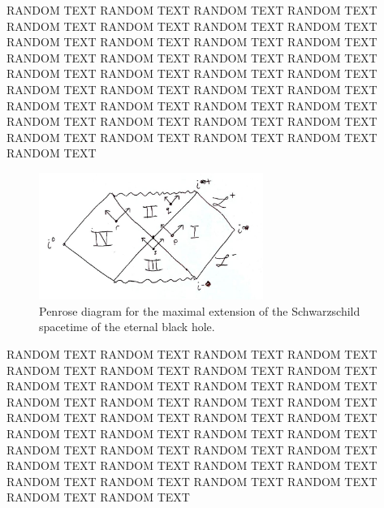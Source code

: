 RANDOM TEXT RANDOM TEXT RANDOM TEXT RANDOM TEXT RANDOM TEXT RANDOM TEXT RANDOM TEXT RANDOM TEXT RANDOM TEXT RANDOM TEXT RANDOM TEXT RANDOM TEXT RANDOM TEXT RANDOM TEXT RANDOM TEXT RANDOM TEXT RANDOM TEXT RANDOM TEXT RANDOM TEXT RANDOM TEXT RANDOM TEXT RANDOM TEXT RANDOM TEXT RANDOM TEXT RANDOM TEXT RANDOM TEXT RANDOM TEXT RANDOM TEXT RANDOM TEXT RANDOM TEXT RANDOM TEXT RANDOM TEXT RANDOM TEXT RANDOM TEXT RANDOM TEXT RANDOM TEXT RANDOM TEXT 

\begin{figure}[H]
\centering
    \includegraphics[width=0.65\textwidth]{png/scbh_penrose.png}
    \caption{Penrose diagram for the maximal extension of the Schwarzschild spacetime of the eternal black hole.}
    \label{intro:fig:scbh_penrose}
\end{figure}

RANDOM TEXT RANDOM TEXT RANDOM TEXT RANDOM TEXT RANDOM TEXT RANDOM TEXT RANDOM TEXT RANDOM TEXT RANDOM TEXT RANDOM TEXT RANDOM TEXT RANDOM TEXT RANDOM TEXT RANDOM TEXT RANDOM TEXT RANDOM TEXT RANDOM TEXT RANDOM TEXT RANDOM TEXT RANDOM TEXT RANDOM TEXT RANDOM TEXT RANDOM TEXT RANDOM TEXT RANDOM TEXT RANDOM TEXT RANDOM TEXT RANDOM TEXT RANDOM TEXT RANDOM TEXT RANDOM TEXT RANDOM TEXT RANDOM TEXT RANDOM TEXT RANDOM TEXT RANDOM TEXT RANDOM TEXT RANDOM TEXT 





